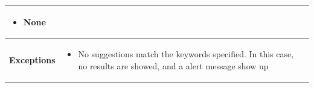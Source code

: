 \begin{table}[H]
\begin{tabular}{|l|p{}|}
\begin{itemize}
 \item None
 \end{itemize}\\ 
 \hline

\textbf{Exceptions} &    \begin{itemize}
   
   \item No suggestions match the keywords specified. In this case, no results are showed, and a alert message show up

\end{itemize}
  
                           \\ \hline

\end{tabular}
\end{table}

\newpage

